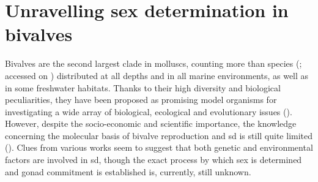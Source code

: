 \section{Unravelling sex determination in bivalves}
Bivalves are the second largest clade in molluscs, counting more than  species (; accessed on ) distributed at all depths and in all marine environments, as well as in some freshwater habitats. Thanks to their high diversity and biological peculiarities, they have been proposed as promising model organisms for investigating a wide array of biological, ecological and evolutionary issues (). However, despite the socio-economic and scientific importance, the knowledge concerning the molecular basis of bivalve reproduction and \gls{sd} is still quite limited (). Clues from various works seem to suggest that both genetic and environmental factors are involved in \gls{sd}, though the exact process by which sex is determined and gonad commitment is established is, currently, still unknown.

